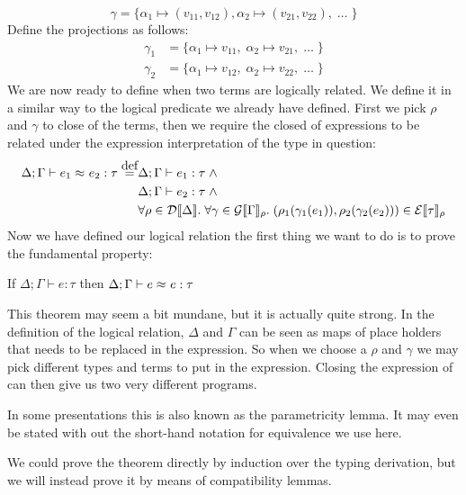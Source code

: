 \[
  \gamma = \{\alpha_1 \mapsto (v_{11},v_{12}), \alpha_2 \mapsto (v_{21},v_{22}),\; \dots\; \}
\]
Define the projections as follows:
\begin{align*}
  \gamma_1 & = \{\alpha_1 \mapsto v_{11}, \; \alpha_2 \mapsto v_{21},\; \dots \;\} \\
  \gamma_2 & = \{\alpha_1 \mapsto v_{12}, \; \alpha_2 \mapsto v_{22},\; \dots \;\}
\end{align*}
We are now ready to define when two terms are logically related. We define it in a similar way to the logical predicate we already have defined. First we pick $\rho$ and $\gamma$ to close of the terms, then we require the closed of expressions to be related under the expression interpretation of the type in question:
\renewcommand{\lreq}[2]{\equivalence{#1}{}{#2}}
\begin{align*}
  \Delta ; \Gamma \vdash \lreq{e_1}{e_2} : \tau \eqdef & \Delta ; \Gamma \vdash e_1 : \tau \pand\\
                                                      & \Delta ; \Gamma \vdash e_2 : \tau \pand \\
                                                      & \forall \rho \in \dpred{\Delta}. \; \forall \gamma \in \gprep{\Gamma}. \; (\rho_1(\gamma_1(e_1)),\rho_2(\gamma_2(e_2))) \in \eprep{\tau}
\end{align*}
Now we have defined our logical relation the first thing we want to do is to prove the fundamental property:
\begin{fundamentalprop}
  If $\Delta; \Gamma \vdash e : \tau$ then $\Delta; \Gamma \vdash \lreq{e}{e} : \tau$
\end{fundamentalprop}
This theorem may seem a bit mundane, but it is actually quite strong. In the definition of the logical relation, $\Delta$ and $\Gamma$ can be seen as maps of place holders that needs to be replaced in the expression. So when we choose a $\rho$ and $\gamma$ we may pick different types and terms to put in the expression. Closing the expression of can then give us two very different programs. 

In some presentations this is also known as the parametricity lemma. It may even be stated with out the short-hand notation for equivalence we use here.

We could prove the theorem directly by induction over the typing derivation, but we will instead prove it by means of compatibility lemmas.

